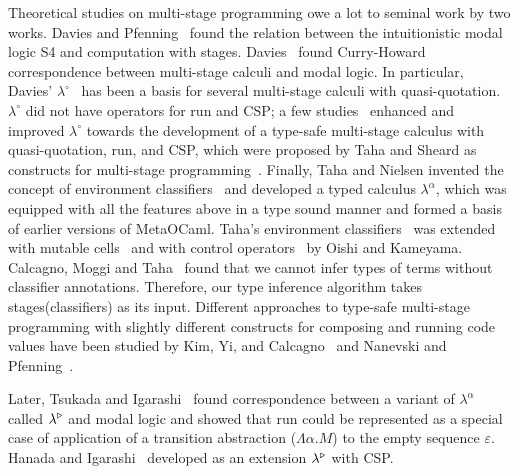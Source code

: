 Theoretical studies on multi-stage programming owe a lot to seminal work by two works.
Davies and Pfenning~\cite{DaviesPfenning1996Modal} found the relation between the
intuitionistic modal logic S4 and computation with stages.
Davies~\cite{Davis1996Temporal} found Curry-Howard correspondence
between multi-stage calculi and modal logic. In particular, Davies'
$\lambda^\circ$~\cite{Davis1996Temporal} has been a basis for several
multi-stage calculi with quasi-quotation. $\lambda^\circ$ did not have
operators for run and CSP; a few
studies~\cite{BenaissaMoggiTahaSheard1999Logical,MoggiTahaBenaissaSheard99ESOP} enhanced and
improved $\lambda^\circ$ towards the development of a type-safe multi-stage
calculus with quasi-quotation, run, and CSP, which were proposed by Taha and
Sheard as constructs for multi-stage programming~\cite{MetaML}. 
Finally, Taha and Nielsen invented the concept of environment
classifiers~\cite{TahaNielsen2003Environment} and developed a typed calculus
$\lambda^\alpha$, which was equipped with all the features above in a type
sound manner and formed a basis of earlier versions of MetaOCaml. Taha's environment
classifiers~\cite{TahaNielsen2003Environment} was extended with mutable
cells~\cite{KiselyovKameyamaSudo2016Refined} and with control
operators~\cite{OishiKameyama2017ControlOperators} by Oishi and Kameyama. Calcagno, Moggi and
Taha~\cite{CalcagnoMoggiTaha2004InferenceClassifiers} found that we cannot
infer types of terms without classifier annotations. Therefore, our type
inference algorithm takes stages(classifiers) as its input. Different
approaches to type-safe multi-stage programming with slightly different
constructs for composing and running code values have been studied by Kim,
Yi, and Calcagno~\cite{KimYi2006PolymorphicModal} and Nanevski and
Pfenning~\cite{NanevskiPfenning2005Staged}.

Later, Tsukada and Igarashi~\cite{TsukadaIgarashi2010Logical} found correspondence
between a variant of \(\lambda^\alpha\) called $\lambda^{\mathop{\triangleright}}$
and modal logic and showed that run could be represented as a special
case of application of a transition abstraction ($\Lambda\alpha.M$) to
the empty sequence $\varepsilon$.  Hanada and
Igarashi~\cite{HanadaIgarashi2014CSP} developed \LTP as an extension
$\lambda^{\mathop{\triangleright}}$ with CSP.


